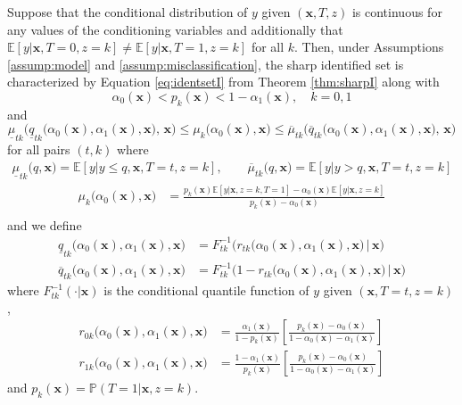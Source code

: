 \begin{thm}
  \label{thm:sharpII}
  Suppose that the conditional distribution of $y$ given $(\mathbf{x}, T,z)$ is continuous for any values of the conditioning variables and additionally  that $\mathbb{E}\left[ y|\mathbf{x},T=0,z=k \right] \neq \mathbb{E}\left[ y|\mathbf{x},T=1,z=k \right]$ for all $k$.
  Then, under Assumptions \ref{assump:model} and \ref{assump:misclassification}, the sharp identified set is characterized by Equation \ref{eq:identsetI} from Theorem \ref{thm:sharpI} along with 
\[
  \alpha_0(\mathbf{x}) < p_k(\mathbf{x}) < 1 -  \alpha_1(\mathbf{x}), \quad k = 0, 1
\]
and
\[
  \underline{\mu}_{tk}\bigg( \underline{q}_{tk}\big( \alpha_0(\mathbf{x}), \alpha_1(\mathbf{x}), \mathbf{x}\big) , \,\mathbf{x} \bigg)\leq 
  \mu_{k}\big( \alpha_0(\mathbf{x}),\mathbf{x} \big)\leq 
  \overline{\mu}_{tk}\bigg(\overline{q}_{tk}\big( \alpha_0(\mathbf{x}), \alpha_1(\mathbf{x}), \mathbf{x}\big), \,\mathbf{x} \bigg)
\]
for all pairs $(t,k)$ where
\begin{align*}
  \underline{\mu}_{tk}\big( q,\mathbf{x} \big) = \mathbb{E}\left[ y\left|\right.y\leq q, \mathbf{x},T=t, z=k\right], \quad \quad
  \overline{\mu}_{tk}\big(q,\mathbf{x} \big) = \mathbb{E}\left[ y\left|\right. y > q, \mathbf{x}, T=t, z=k\right]
\end{align*}
  \begin{align*}
  \mu_k\big(\alpha_0(\mathbf{x}),\mathbf{x}\big) &= 
  \frac{p_k(\mathbf{x}) \mathbb{E}[y|\mathbf{x},z=k,T=1] - \alpha_0(\mathbf{x}) \mathbb{E}[y|\mathbf{x},z=k]}{p_k(\mathbf{x}) - \alpha_0(\mathbf{x})}\\
\end{align*}
and we define 
\begin{align*}
  \underline{q}_{tk}\big(\alpha_0(\mathbf{x}),\alpha_1(\mathbf{x}),\mathbf{x}\big) &= F^{-1}_{tk}\bigg(r_{tk}\big(\alpha_0(\mathbf{x}),\alpha_1(\mathbf{x}), \mathbf{x}\big)\, \bigg|\,\mathbf{x}\bigg)\\
  \overline{q}_{tk}\big(\alpha_0(\mathbf{x}),\alpha_1(\mathbf{x}),\mathbf{x}\big) &= F^{-1}_{tk}\bigg(1 - r_{tk}\big(\alpha_0(\mathbf{x}), \alpha_1(\mathbf{x}),\mathbf{x}\big) \,\bigg|\,\mathbf{x}\bigg)
\end{align*}
where $F_{tk}^{-1}(\cdot|\mathbf{x})$ is the conditional quantile function of $y$ given $(\mathbf{x},T=t,z=k)$,  
\begin{align*}
  r_{0k}\big(\alpha_0(\mathbf{x}),\alpha_1(\mathbf{x}),\mathbf{x}\big) &= \frac{\alpha_1(\mathbf{x})}{1 - p_k(\mathbf{x})} \left[ \frac{p_k(\mathbf{x}) - \alpha_0(\mathbf{x})}{1 - \alpha_0(\mathbf{x}) - \alpha_1(\mathbf{x})} \right]\\
  r_{1k}\big(\alpha_0(\mathbf{x}),\alpha_1(\mathbf{x}),\mathbf{x}\big) &= \frac{1 - \alpha_1(\mathbf{x})}{p_k(\mathbf{x})} \left[ \frac{p_k(\mathbf{x}) - \alpha_0(\mathbf{x})}{1 - \alpha_0(\mathbf{x}) - \alpha_1(\mathbf{x})} \right]
\end{align*}
and $p_k(\mathbf{x}) = \mathbb{P}(T=1|\mathbf{x},z=k)$.
\end{thm}


